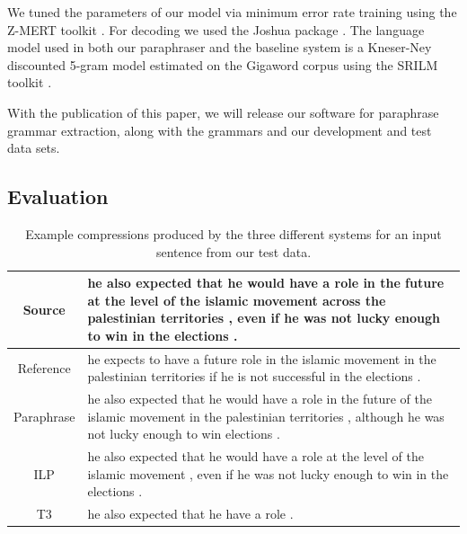 \documentclass[11pt]{article}
\begin{document}
We tuned the parameters of our model via minimum error rate training
using the Z-MERT toolkit \cite{Zaidan2009}. For decoding we used the
Joshua package \cite{Joshua-WMT}. The language model used in both our
paraphraser and the  baseline system is a
Kneser-Ney discounted 5-gram model estimated on the Gigaword corpus
using the SRILM toolkit \cite{SRILM}.

With the publication of this paper, we will release our software for
paraphrase grammar extraction, along with the grammars and our
development and test data sets.


\subsection{Evaluation} \label{evaluation}

\begin{table}
\begin{center}
\small
\begin{tabular}{|c|p{13.2cm}|}
  \hline
  Source & he also expected that he would have a role in the future at
  the level of the islamic movement across the palestinian territories
  , even if he was not lucky enough to win in the elections . \\
  \hline
  Reference & he expects to have a future role in the islamic movement
  in the palestinian territories if he is not successful in the
  elections . \\
  \hline
  Paraphrase & he also expected that he would have a role in the future
  of the islamic movement in the palestinian territories , although he
  was not lucky enough to win elections . \\
  \hline
  ILP & he also expected that he would have a role at the level of the
  islamic movement , even if he was not lucky enough to win in the
  elections . \\
  \hline
  T3 & he also expected that he have a role . \\
  \hline
\end{tabular}
\normalsize
\end{center}
\caption{Example compressions produced by the three different systems
  for an input sentence from our test data.}
\label{test_examples}
\end{table}
\end{document}

